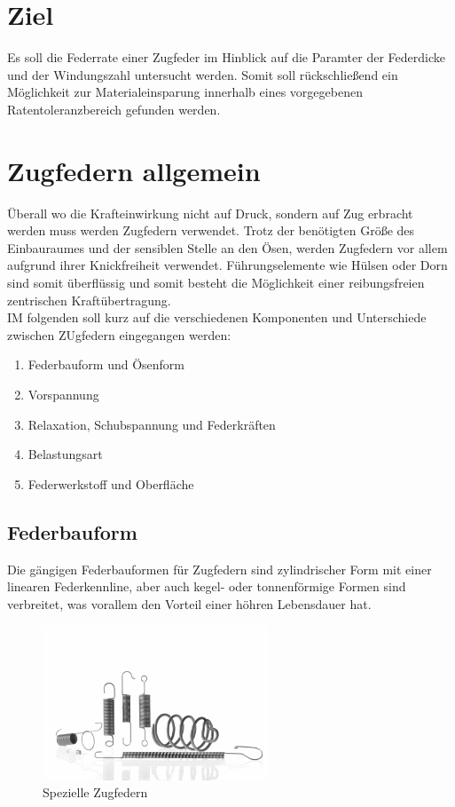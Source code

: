 \newpage
\section*{Ziel}
Es soll die Federrate einer Zugfeder im Hinblick auf die Paramter der Federdicke und der Windungszahl
untersucht werden. Somit soll rückschließend ein Möglichkeit zur Materialeinsparung 
innerhalb eines vorgegebenen Ratentoleranzbereich gefunden werden.  

\section{Zugfedern allgemein}
Überall wo die Krafteinwirkung nicht auf Druck, sondern auf Zug erbracht werden muss
werden Zugfedern verwendet. Trotz der benötigten Größe des Einbauraumes und der sensiblen
Stelle an den Ösen, werden Zugfedern vor allem aufgrund ihrer Knickfreiheit verwendet.
Führungselemente wie Hülsen oder Dorn sind somit überflüssig und somit besteht die Möglichkeit
einer reibungsfreien zentrischen Kraftübertragung.\\
IM folgenden soll kurz auf die verschiedenen Komponenten und Unterschiede zwischen
ZUgfedern eingegangen werden:
\begin{enumerate}
    \item Federbauform und Ösenform
    \item Vorspannung
    \item Relaxation, Schubspannung und Federkräften
    \item Belastungsart
    \item Federwerkstoff und Oberfläche
\end{enumerate}



\subsection{Federbauform}
Die gängigen Federbauformen für Zugfedern sind zylindrischer Form mit einer linearen
Federkennline, aber auch kegel- oder tonnenförmige Formen sind verbreitet, was vorallem
den Vorteil einer höhren Lebensdauer hat.
\begin{figure}[H]
    \centering
    \includegraphics[width=0.6\textwidth]{bilder/Input/zugfedern_spezial.jpg}
    \caption{Spezielle Zugfedern \cite{KompZ}}
\end{figure}



